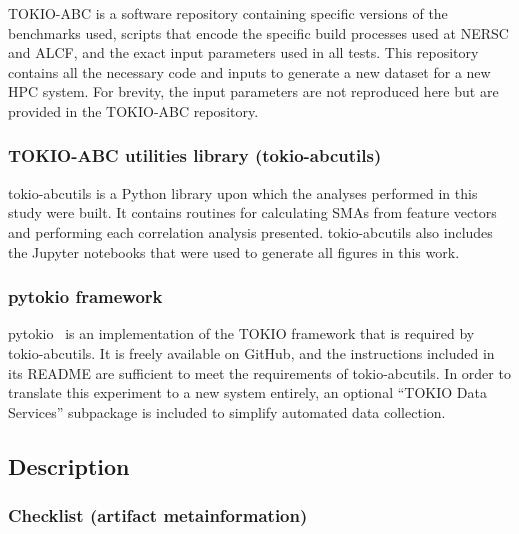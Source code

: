 TOKIO-ABC is a software repository containing specific versions of the benchmarks used, scripts that encode the specific build processes used at NERSC and ALCF, and the exact input parameters used in all tests.
This repository contains all  the necessary code and inputs to generate a new dataset for a new HPC system.
For brevity, the input parameters are not reproduced here but are provided in the TOKIO-ABC repository.

\subsubsection{TOKIO-ABC utilities library (tokio-abcutils)}

tokio-abcutils is a Python library upon which the analyses performed in this study were built.
It contains routines for calculating SMAs from feature vectors and performing each correlation analysis presented.
tokio-abcutils also includes the Jupyter notebooks that were used to generate all figures in this work.

\subsubsection{pytokio framework}

pytokio~\cite{Lockwood2018tokio} is an implementation of the TOKIO framework that is required by tokio-abcutils.
It is freely available on GitHub, and the instructions included in its README are sufficient to meet the requirements of tokio-abcutils.
In order to translate this experiment to a new system entirely, an optional ``TOKIO Data Services'' subpackage is included to simplify automated data collection.

\subsection{Description}

\subsubsection{Checklist (artifact metainformation)}

